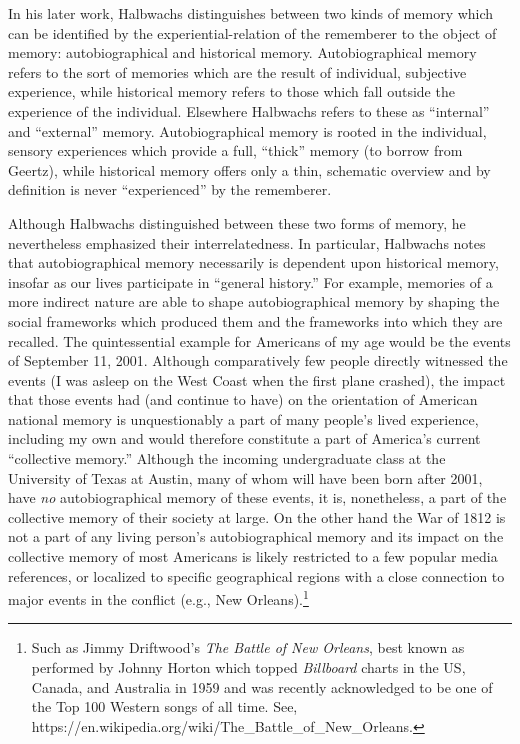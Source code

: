 In his later work, Halbwachs distinguishes between two kinds of memory
which can be identified by the experiential-relation of the rememberer
to the object of memory: autobiographical and historical
memory.\autocite[52]{halbwachs1980} Autobiographical memory refers to
the sort of memories which are the result of individual, subjective
experience, while historical memory refers to those which fall outside
the experience of the individual. Elsewhere Halbwachs refers to these as
``internal'' and ``external'' memory. Autobiographical memory is rooted
in the individual, sensory experiences which provide a full, ``thick''
memory (to borrow from Geertz), while historical memory offers only a
thin, schematic overview and by definition is never ``experienced'' by
the rememberer.

Although Halbwachs distinguished between these two forms of memory, he
nevertheless emphasized their interrelatedness. In particular, Halbwachs
notes that autobiographical memory necessarily is dependent upon
historical memory, insofar as our lives participate in ``general
history.''\autocite[52]{halbwachs1980} For example, memories of a more
indirect nature are able to shape autobiographical memory by shaping the
social frameworks which produced them and the frameworks into which they
are recalled. The quintessential example for Americans of my age would
be the events of September 11, 2001. Although comparatively few people
directly witnessed the events (I was asleep on the West Coast when the
first plane crashed), the impact that those events had (and continue to
have) on the orientation of American national memory is unquestionably a
part of many people's lived experience, including my own and would
therefore constitute a part of America's current ``collective memory.''
Although the incoming undergraduate class at the University of Texas at
Austin, many of whom will have been born after 2001, have \emph{no}
autobiographical memory of these events, it is, nonetheless, a part of
the collective memory of their society at large. On the other hand the
War of 1812 is not a part of any living person's autobiographical memory
and its impact on the collective memory of most Americans is likely
restricted to a few popular media references, or localized to specific
geographical regions with a close connection to major events in the
conflict (e.g., New Orleans).\footnote{Such as Jimmy Driftwood's
  \emph{The Battle of New Orleans}, best known as performed by Johnny
  Horton which topped \emph{Billboard} charts in the US, Canada, and
  Australia in 1959 and was recently acknowledged to be one of the Top
  100 Western songs of all time. See,
  https://en.wikipedia.org/wiki/The\_Battle\_of\_New\_Orleans.}

